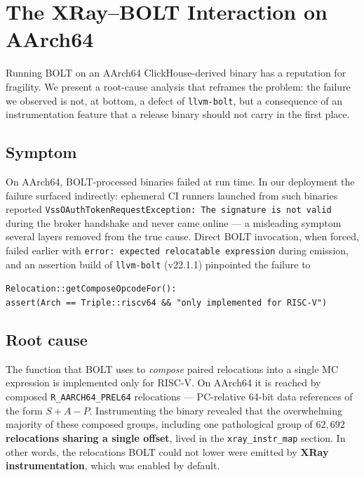 \section{The XRay--BOLT Interaction on AArch64}
\label{sec:xray}

Running BOLT on an AArch64 ClickHouse-derived binary has a reputation for
fragility. We present a root-cause analysis that reframes the problem: the
failure we observed is not, at bottom, a defect of \texttt{llvm-bolt}, but a
consequence of an instrumentation feature that a release binary should not
carry in the first place.

\subsection{Symptom}

On AArch64, BOLT-processed binaries failed at run time. In our deployment the
failure surfaced indirectly: ephemeral CI runners launched from such binaries
reported \texttt{VssOAuthTokenRequestException: The signature is not valid}
during the broker handshake and never came online --- a misleading symptom
several layers removed from the true cause. Direct BOLT invocation, when forced,
failed earlier with \texttt{error: expected relocatable expression} during
emission, and an assertion build of \texttt{llvm-bolt} (v22.1.1) pinpointed the
failure to
\begin{center}
\texttt{Relocation::getComposeOpcodeFor():}\\
\texttt{assert(Arch == Triple::riscv64 \&\& "only implemented for RISC-V")}
\end{center}

\subsection{Root cause}

The function that BOLT uses to \emph{compose} paired relocations into a single
MC expression is implemented only for RISC-V. On AArch64 it is reached by
composed \texttt{R\_AARCH64\_PREL64} relocations --- PC-relative 64-bit data
references of the form $S + A - P$. Instrumenting the binary revealed that the
overwhelming majority of these composed groups, including one pathological group
of \textbf{$62{,}692$ relocations sharing a single offset}, lived in the
\texttt{xray\_instr\_map} section. In other words, the relocations BOLT could
not lower were emitted by \textbf{XRay instrumentation}, which was enabled by
default.


